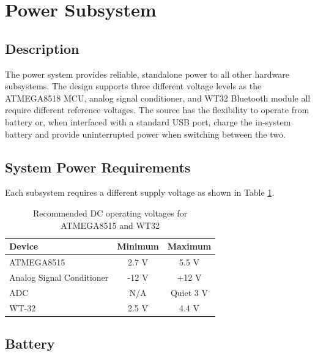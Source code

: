 \section [Power]{Power Subsystem}
\subsection{Description}

The power system  provides reliable, standalone power to all other hardware subsystems. The design supports three different voltage levels as the ATMEGA8518 MCU, analog signal conditioner, and WT32 Bluetooth \textregistered module all require different reference voltages. The source has the flexibility to operate from battery or, when interfaced with a standard USB port, charge the in-system battery and provide uninterrupted power when switching between the two.  

\subsection{System Power Requirements}

Each subsystem requires a different supply voltage as shown in Table \ref{tab:power requirements}. 
\begin{table}[bhp]
\caption[Power Requirements]{Recommended DC operating voltages for ATMEGA8515\cite{ds:ATMEGA8515} and WT32\cite{ds:WT32}}
\small
\begin{center}
\begin{tabular}{l| c c}
\setlength{\tabcolsep}{1pt}
	Device     & Minimum   & Maximum \\\hline
	ATMEGA8515 & 2.7 V     & 5.5 V   \\             
	Analog Signal 
	Conditioner& -12 V     & +12 V\\            
  \small{ADC}& N/A		   & Quiet 3 V\\
	WT-32      & 2.5 V     & 4.4 V            
\end{tabular}
\end{center}
\label{tab:power requirements}
\end{table}

\subsection{Battery}

